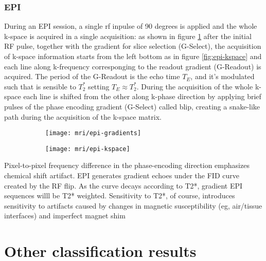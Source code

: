 \documentclass[a4paper,11pt]{article}
\begin{document}
\subsubsection{EPI}
During an EPI session, a single rf inpulse of 90 degrees is applied and the whole k-space is acquired in a single acquisition:
as shown in figure \ref{fig:epi-gradients} after the initial RF pulse, together with the gradient for slice selection (G-Select), the acquisition of k-space information starts from the left bottom as in figure \ref{fig:epi-kspace} and each line along k-frequency corresponging to the readout gradient (G-Readout) is acquired.
The period of the G-Readout is the echo time $T_E$, and it's modulated such that is sensible to $T_2^{\ast}$ setting $T_E \approx T_2^{\ast}$.
During the acquisition of the whole k-space each line is shifted from the other along k-phase direction by applying brief pulses of the phase encoding gradient (G-Select) called blip, creating a snake-like path during the acquisition of the k-space matrix.


\begin{figure}
\begin{subfigure}{0.5\textwidth}
\texttt{[image: mri/epi-gradients]}
\caption{}
\label{fig:epi-gradients}
\end{subfigure}
\begin{subfigure}{0.5\textwidth}
\texttt{[image: mri/epi-kspace]}
\caption{}
\label{}
\end{subfigure}
\caption{}
\label{fig:epi}
\end{figure}


Pixel-to-pixel frequency difference in the phase-encoding direction emphasizes chemical shift artifact.
EPI generates gradient echoes under the FID curve created by the RF flip. As the curve decays according to T2*, gradient EPI sequences willl be T2* weighted.
Sensitivity to T2*, of course, introduces sensitivity to artifacts caused by changes in magnetic susceptibility (eg, air/tissue interfaces) and imperfect magnet shim

\section{Other classification results}
\end{document}

